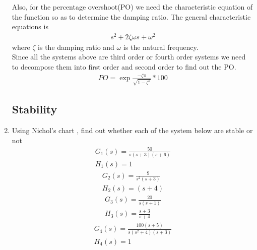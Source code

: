 \begin{enumerate}[label=\thesection.\arabic*.,ref=\thesection.\theenumi]
\begin{figure}[!ht]
	\begin{center}
		\resizebox{\columnwidth}{!}{}
	\end{center}
\caption{}
\label{fig:es17btech11009_flow}
\end{figure}
Also, for the percentage overshoot(PO) we need the characteristic equation of the function so as to determine the damping ratio.
The general characteristic equations is 
\begin{align}
 s^2 + 2\zeta \omega  s + \omega ^2 
\label{es17btech11009_char}
\end{align}
where $\zeta$ is the damping ratio and $\omega$ is the natural frequency.
\\
Since all the systems above are third order or fourth order systems we need to decompose them into first order and second order to find out the PO.
\begin{align}
PO = \exp{\frac{-\zeta \pi}{\sqrt{1- \zeta^2}}} * 100
\label{es17btech11009_po}
\end{align}

\subsection{Stability}
\item
Using Nichol's chart , find out whether each of the system below are stable or not 
\begin{align}
G_{1}(s)= \frac{50}{s(s+3)(s+6)}
\label{eq:es17btech11009_a}
\\
 H_{1}(s)= 1
 \label{eq:es17btech11009_b}
\end{align}
\begin{align}
G_{2}(s)= \frac{9}{s^2(s+3)}
\label{eq:es17btech11009_c}
\\
 H_{2}(s)= (s+4)
 \label{eq:es17btech11009_d}
\end{align}
\begin{align}
G_{3}(s)= \frac{20}{s(s+1)}
\label{eq:es17btech11009_e}
\\
 H_{3}(s)= \frac{s+3}{s+4}
 \label{eq:es17btech11009_f}
\end{align}
\begin{align}
G_{4}(s)= \frac{100(s+5)}{s(s^2+4)(s+3)}
\label{eq:es17btech11009_g}
\\
 H_{4}(s)= 1
 \label{eq:es17btech11009_h}
\end{align}


\end{enumerate}
